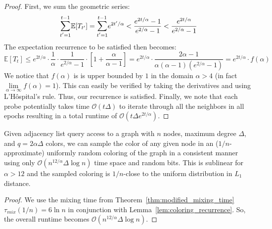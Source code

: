 \begin{proof}
First, we sum the geometric series:
\[
\mathlarger\sum\limits_{t'=1}^{t-1} \mathbb E[T_{t'}] = \mathlarger\sum\limits_{t'=1}^{t-1} e^{2t'/\alpha}
< \frac{e^{2t/\alpha}-1}{e^{2/\alpha}-1} < \frac{e^{2t/\alpha}}{e^{2/\alpha}-1}
\]
The expectation recurrence to be satisfied then becomes:
\[
\mathbb E[T_t]\le e^{2t/\alpha}\cdot \frac 1{\alpha}\cdot \frac{1}{e^{2/\alpha}-1}\cdot \left[ 1+ \frac{\alpha}{\alpha-1} \right]
= e^{2t/\alpha}\cdot \frac{2\alpha-1}{\alpha(\alpha-1)(e^{2/\alpha}-1)} = e^{2t/\alpha}\cdot f(\alpha)
\]
We notice that $f(\alpha)$ is is upper bounded by $1$ in the domain $\alpha> 4$ (in fact $\lim\limits_{\alpha\to\infty}f(\alpha) = 1$).
This can easily be verified by taking the derivatives and using L'H\^{o}spital's rule.
Thus, our recurrence is satisfied.
Finally, we note that each probe potentially takes time $\mathcal O(t\Delta)$ to iterate through all the neighbors in all epochs
resulting in a total runtime of $\mathcal O(t\Delta e^{2t/\alpha})$.
\end{proof}


\begin{theorem}
\label{thm:coloring_generator_main}
Given adjacency list query access to a graph with $n$ nodes, maximum degree $\Delta$, and $q=2\alpha\Delta$ colors,
we can sample the color of any given node in an ($1/n$-approximate) uniformly random coloring of the graph in a consistent manner
using only $\mathcal O(n^{12/\alpha}\Delta\log n)$ time space and random bits.
This is sublinear for $\alpha>12$ and the sampled coloring is $1/n$-close to the uniform distribution in $L_1$ distance.
\end{theorem}
\begin{proof}
We use the mixing time from Theorem~\ref{thm:modified_mixing_time} $\tau_{mix}(1/n) = 6\ln n$ in conjunction with Lemma~\ref{lem:coloring_recurrence}.
So, the overall runtime becomes $\mathcal O(n^{12/\alpha}\Delta\log n)$.
\end{proof}

